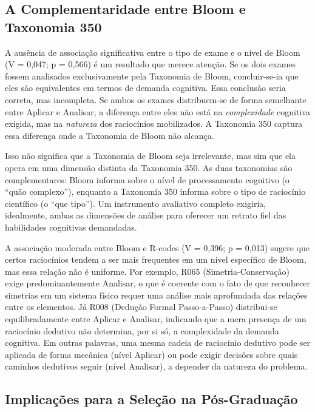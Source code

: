 \documentclass[
  12pt,
  a4paper,
  twoside,
  brazilian
]{article}
\begin{document}
\subsection{A Complementaridade entre Bloom e Taxonomia
350}\label{a-complementaridade-entre-bloom-e-taxonomia-350}

A ausência de associação significativa entre o tipo de exame e o nível
de Bloom (V = 0,047; p = 0,566) é um resultado que merece atenção. Se os
dois exames fossem analisados exclusivamente pela Taxonomia de Bloom,
concluir-se-ia que eles são equivalentes em termos de demanda cognitiva.
Essa conclusão seria correta, mas incompleta. Se ambos os exames
distribuem-se de forma semelhante entre Aplicar e Analisar, a diferença
entre eles não está na \emph{complexidade} cognitiva exigida, mas na
\emph{natureza} dos raciocínios mobilizados. A Taxonomia 350 captura
essa diferença onde a Taxonomia de Bloom não alcança.

Isso não significa que a Taxonomia de Bloom seja irrelevante, mas sim
que ela opera em uma dimensão distinta da Taxonomia 350. As duas
taxonomias são complementares: Bloom informa sobre o nível de
processamento cognitivo (o ``quão complexo''), enquanto a Taxonomia 350
informa sobre o tipo de raciocínio científico (o ``que tipo''). Um
instrumento avaliativo completo exigiria, idealmente, ambas as dimensões
de análise para oferecer um retrato fiel das habilidades cognitivas
demandadas.

A associação moderada entre Bloom e R-codes (V = 0,396; p = 0,013)
sugere que certos raciocínios tendem a ser mais frequentes em um nível
específico de Bloom, mas essa relação não é uniforme. Por exemplo, R065
(Simetria-Conservação) exige predominantemente Analisar, o que é
coerente com o fato de que reconhecer simetrias em um sistema físico
requer uma análise mais aprofundada das relações entre os elementos. Já
R008 (Dedução Formal Passo-a-Passo) distribui-se equilibradamente entre
Aplicar e Analisar, indicando que a mera presença de um raciocínio
dedutivo não determina, por si só, a complexidade da demanda cognitiva.
Em outras palavras, uma mesma cadeia de raciocínio dedutivo pode ser
aplicada de forma mecânica (nível Aplicar) ou pode exigir decisões sobre
quais caminhos dedutivos seguir (nível Analisar), a depender da natureza
do problema.

\subsection{Implicações para a Seleção na
Pós-Graduação}\label{implicauxe7uxf5es-para-a-seleuxe7uxe3o-na-puxf3s-graduauxe7uxe3o}
\end{document}
